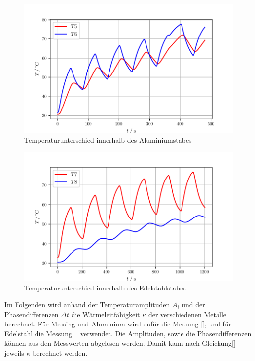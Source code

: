 \begin{figure}
    \centering
    \includegraphics[width=\textwidth]{data/T5T6.pdf}
    \caption{Temperaturunterschied innerhalb des Aluminiumstabes}
    \label{fig:t5t6}
\end{figure}

\begin{figure}
    \centering
    \includegraphics[width=\textwidth]{data/T7T8.pdf}
    \caption{Temperaturunterschied innerhalb des Edelstahlstabes}
    \label{fig:t7t8}
\end{figure}

Im Folgenden wird anhand der Temperaturamplituden $A_i$ und der Phasendifferenzen $\Delta t$ die Wärmeleitfähigkeit $\kappa$
der verschiedenen Metalle berechnet. Für Messing und Aluminium wird dafür die Messung [], und für Edelstahl die Messung [] verwendet.
Die Amplituden, sowie die Phasendifferenzen können aus den Messwerten abgelesen werden. Damit kann nach Gleichung[] jeweils $\kappa$ 
berechnet werden.

